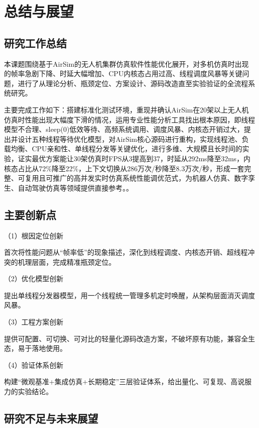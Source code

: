 
\chapter{总结与展望}

\section{研究工作总结}

本课题围绕基于AirSim的无人机集群仿真软件性能优化展开，对多机仿真时出现的帧率急剧下降、时延大幅增加、CPU内核态占用过高、线程调度风暴等关键问题，进行了从理论分析、瓶颈定位、方案设计、源码改造直至实验验证的全流程系统研究。

主要完成工作如下：搭建标准化测试环境，重现并确认AirSim在20架以上无人机仿真时性能出现大幅度下滑的情况，运用专业性能分析工具找出根本原因，即线程模型不合理、sleep(0)低效等待、高频系统调用、调度风暴、内核态开销过大，提出并设计五种线程等待优化模型，对AirSim核心源码进行重构，实现线程池、负载均衡、CPU亲和性、单线程分发等关键优化，进行多维、大规模且长时间的实验，证实最优方案能让30架仿真时FPS从3提高到37，时延从292ms降至32ms，内核态占比从72\%降至22\%，上下文切换从286万次/秒降至8.3万次/秒，形成一套完整、可复用且可推广的高并发实时仿真系统性能调优范式，为机器人仿真、数字孪生、自动驾驶仿真等领域提供直接参考。。

\section{主要创新点}

（1）根因定位创新

首次将性能问题从``帧率低''的现象描述，深化到线程调度、内核态开销、超线程冲突的机理层面，完成精准瓶颈定位。

（2）优化模型创新

提出单线程分发器模型，用一个线程统一管理多机定时唤醒，从架构层面消灭调度风暴。

（3）工程方案创新

提供可配置、可切换、可对比的轻量化源码改造方案，不破坏原有功能，兼容全生态，易于落地使用。

（4）验证体系创新

构建``微观基准+集成仿真+长期稳定''三层验证体系，给出量化、可复现、高说服力的实验结论。

\section{研究不足与未来展望}

